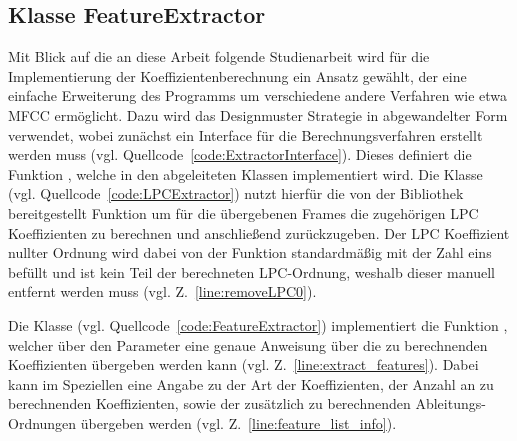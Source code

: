 \subsection{Klasse FeatureExtractor}
Mit Blick auf die an diese Arbeit folgende Studienarbeit wird für die Implementierung der Koeffizientenberechnung ein Ansatz gewählt, der eine einfache Erweiterung des Programms um verschiedene andere Verfahren wie etwa \ac{MFCC} ermöglicht.
Dazu wird das Designmuster Strategie in abgewandelter Form verwendet, wobei zunächst ein Interface für die Berechnungsverfahren erstellt werden muss (vgl. Quellcode~\ref{code:ExtractorInterface}).
Dieses definiert die Funktion , welche in den abgeleiteten Klassen implementiert wird.
Die Klasse  (vgl. Quellcode~\ref{code:LPCExtractor}) nutzt hierfür die von der Bibliothek  bereitgestellt Funktion  um für die übergebenen Frames die zugehörigen \ac{LPC} Koeffizienten zu berechnen und anschließend zurückzugeben.
Der \ac{LPC} Koeffizient nullter Ordnung wird dabei von der Funktion standardmäßig mit der Zahl eins befüllt und ist kein Teil der berechneten \ac{LPC}-Ordnung, weshalb dieser manuell entfernt werden muss (vgl. Z.~\ref{line:removeLPC0}).

Die Klasse  (vgl. Quellcode~\ref{code:FeatureExtractor}) implementiert die Funktion , welcher über den Parameter  eine genaue Anweisung über die zu berechnenden Koeffizienten übergeben werden kann (vgl. Z.~\ref{line:extract_features}).
Dabei kann im Speziellen eine Angabe zu der Art der Koeffizienten, der Anzahl an zu berechnenden Koeffizienten, sowie der zusätzlich zu berechnenden Ableitungs-Ordnungen übergeben werden (vgl. Z.~\ref{line:feature_list_info}).